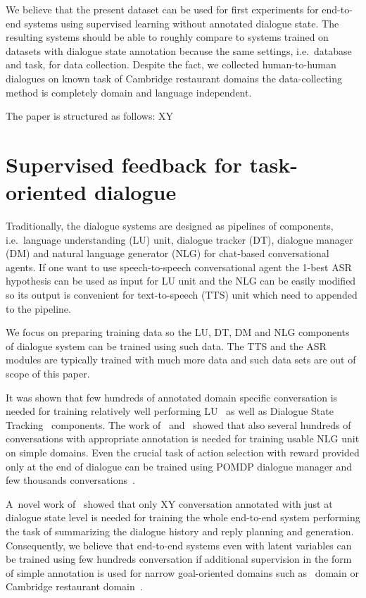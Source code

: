 \documentclass[runningheads,a4paper]{llncs}
\begin{document}
We believe that the present dataset can be used for first experiments for end-to-end systems using supervised learning without annotated dialogue state.
The resulting systems should be able to roughly compare to systems trained on datasets with \cite{dstsc2, dstc3} dialogue state annotation because the same settings, i.e.\ database and task, for data collection.
Despite the fact, we collected human-to-human dialogues on known task of Cambridge restaurant domains the data-collecting method is completely domain and language independent.

The paper is structured as follows:
XY


\section{Supervised feedback for task-oriented dialogue}
\label{sec:repre}
Traditionally, the dialogue systems are designed as pipelines of components, i.e.\ language understanding (LU) unit, dialogue tracker (DT), dialogue manager (DM) and natural language generator (NLG) for chat-based conversational agents.
If one want to use speech-to-speech conversational agent the 1-best ASR hypothesis can be used as input for LU unit and the NLG can be easily modified so its output is convenient for text-to-speech (TTS) unit which need to appended to the pipeline.

We focus on preparing training data so the LU, DT, DM and NLG components of dialogue system can be trained using such data.
The TTS and the ASR modules are typically trained with much more data and such data sets are out of scope of this paper.

It was shown that few hundreds of annotated domain specific conversation is needed for training relatively well performing LU~\cite{Alex} as well as Dialogue State Tracking~\cite{todo-Young?} components.
The work of~\cite{dusek} and~\cite{Marraise} showed that also several hundreds of conversations with appropriate annotation is needed for training usable NLG unit on simple domains.
Even the crucial task of action selection with reward provided only at the end of dialogue can be trained using POMDP dialogue manager and few thousands conversations~\cite{Gasic}.

A~novel work of~\cite{Wen} showed that only XY conversation annotated with just at dialogue state level is needed for training the whole end-to-end system performing the task of summarizing the dialogue history and reply planning and generation.
Consequently, we believe that end-to-end systems even with latent variables can be trained using few hundreds conversation if additional supervision in the form of simple annotation is used for narrow goal-oriented domains such as~\cite{Wen} domain or Cambridge restaurant domain~\cite{DSTC2}.
\end{document}

